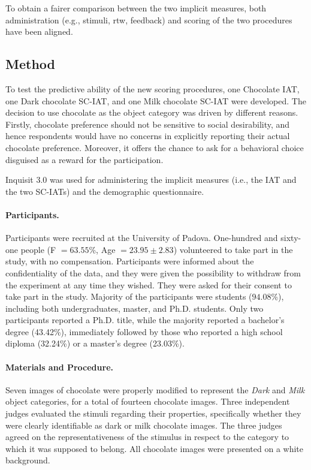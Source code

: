 \documentclass[12pt]{book}
\begin{document}
To obtain a fairer comparison between the two implicit measures, both administration (e.g., stimuli, rtw, feedback) and scoring of the two procedures have been aligned.

\subsection{Method}\label{sub:fairerMethod}

To test the predictive ability of the new scoring procedures, one Chocolate IAT, one Dark chocolate SC-IAT, and one Milk chocolate SC-IAT were developed. 
The decision to use chocolate as the object category was driven by different reasons. Firstly, chocolate preference should not be sensitive to social desirability, and hence respondents would have no concerns in explicitly reporting their actual chocolate preference. Moreover, it offers the chance to ask for a behavioral choice disguised as a reward for the participation.

Inquisit 3.0 \cite{inquisit3} was used for administering the implicit measures (i.e., the IAT and the two SC-IATs) and the demographic questionnaire.


\paragraph{Participants.}

Participants were recruited at the University of Padova. One-hundred and sixty-one people (F $= 63.55$\%, Age $= 23.95 \pm 2.83$) volunteered to take part in the study, with no compensation. Participants were informed about the confidentiality of the data, and they were given the possibility to withdraw from the experiment at any time they wished. They were asked for their consent to take part in the study. Majority of the participants were students ($94.08$\%), including both undergraduates, master, and Ph.D. students. Only two participants reported a Ph.D. title, while the majority reported a bachelor’s degree (43.42\%), immediately followed by those who reported a high school diploma (32.24\%) or a master’s degree (23.03\%). 

\paragraph{Materials and Procedure.}
Seven images of chocolate were properly modified to represent the \emph{Dark} and \emph{Milk} object categories, for a total of fourteen chocolate images. 
Three independent judges evaluated the stimuli regarding their properties, specifically whether they were clearly identifiable as dark or milk chocolate images. The three judges agreed on the representativeness of the stimulus in respect to the category to which it was supposed to belong. All chocolate images were presented on a white background. 
\end{document}
